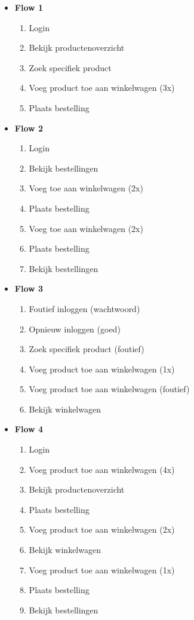 \begin{itemize}
	\item \textbf{Flow 1}
	\begin{enumerate}
		\item Login
		\item Bekijk productenoverzicht
		\item Zoek specifiek product
		\item Voeg product toe aan winkelwagen (3x)
		\item Plaats bestelling
	\end{enumerate}
	
	\item \textbf{Flow 2}
	\begin{enumerate}
		\item Login
		\item Bekijk bestellingen
		\item Voeg toe aan winkelwagen (2x)
		\item Plaats bestelling
		\item Voeg toe aan winkelwagen (2x)
		\item Plaats bestelling
		\item Bekijk bestellingen
	\end{enumerate}
	
	\item \textbf{Flow 3}
	\begin{enumerate}
		\item Foutief inloggen (wachtwoord)
		\item Opnieuw inloggen (goed)
		\item Zoek specifiek product (foutief)
		\item Voeg product toe aan winkelwagen (1x)
		\item Voeg product toe aan winkelwagen (foutief)
		\item Bekijk winkelwagen
	\end{enumerate}
	
	\item \textbf{Flow 4}
	\begin{enumerate}
		\item Login
		\item Voeg product toe aan winkelwagen (4x)
		\item Bekijk productenoverzicht
		\item Plaats bestelling
		\item Voeg product toe aan winkelwagen (2x)
		\item Bekijk winkelwagen
		\item Voeg product toe aan winkelwagen (1x)
		\item Plaats bestelling
		\item Bekijk bestellingen
	\end{enumerate}
	

\end{itemize}
